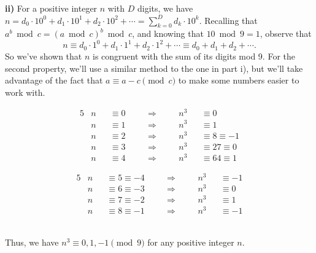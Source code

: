 \begin{solution}
        \textbf{ii)} For a positive integer $n$ with $D$ digits, we have $\displaystyle n = d_0 \cdot 10^0 + d_1 \cdot 10^1 + d_2 \cdot 10^2 + \cdots = \sum_{k=0}^D d_k \cdot 10^k$. Recalling that $a^b \bmod c = (a \bmod c)^b \bmod c$, and knowing that $10 \bmod 9 = 1$, observe that
        \[
            n \equiv d_0 \cdot 1^0 + d_1 \cdot 1^1 + d_2 \cdot 1^2 + \cdots \equiv d_0 + d_1+d_2 + \cdots.
        \]
        So we've shown that $n$ is congruent with the sum of its digits mod 9. For the second property, we'll use a similar method to the one in part i), but we'll take advantage of the fact that $a \equiv a - c \pmod c$ to make some numbers easier to work with.\\[-17pt]
        \noindent \hspace{30pt}
        \begin{minipage}[t]{0.45\linewidth}\vspace{0pt}
        \begin{alignat*}{5}
        &n &&\equiv 0 \quad &&\Rightarrow \quad &&n^3 &&\equiv 0\\
        &n &&\equiv 1 \quad &&\Rightarrow \quad &&n^3 &&\equiv 1\\
        &n &&\equiv 2 \quad &&\Rightarrow \quad &&n^3 &&\equiv 8 \equiv -1\\
        &n &&\equiv 3 \quad &&\Rightarrow \quad &&n^3 &&\equiv 27 \equiv 0\\
        &n &&\equiv 4 \quad &&\Rightarrow \quad &&n^3 &&\equiv 64 \equiv 1
        \end{alignat*}
        \end{minipage}
        \hspace{0pt}
        \begin{minipage}[t]{0.3\linewidth}\vspace{0pt}
        \begin{alignat*}{5}
        &n &&\equiv 5 \equiv -4 \quad &&\Rightarrow \quad &&n^3 &&\equiv -1\\
        &n &&\equiv 6 \equiv -3 \quad &&\Rightarrow \quad &&n^3 &&\equiv 0\\
        &n &&\equiv 7 \equiv -2 \quad &&\Rightarrow \quad &&n^3 &&\equiv 1\\
        &n &&\equiv 8 \equiv -1 \quad &&\Rightarrow \quad &&n^3 &&\equiv -1
        \end{alignat*}
        \end{minipage}\\[10pt]
        Thus, we have $n^3 \equiv 0,1, -1 \pmod 9$ for any positive integer  $n$.
\end{solution}

